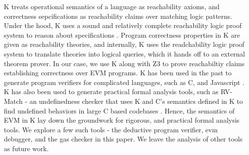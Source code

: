K treats operational semantics of a language as reachability axioms, and correctness sepcifications as reachability claims over matching logic patterns. Under the hood, K uses a sound and relatively complete reachability logic proof system to reason about specifications \cite{stefanescu-park-yuwen-li-rosu-2016-oopsla} \cite{stefanescu-ciobaca-mereuta-moore-serbanuta-rosu-2014-rta}. Program correctness properties in K are given as reachability theories, and internally, K uses the readchability logic proof system to translate theories into logical queries, which it hands off to an external theorem prover. In our case, we use K along with Z3 \cite{de2008z3} to prove reachabiltiy claims establishing correctness over EVM programs. K has been used in the past to generate program verifiers for complicated languages, such as C, and Javascript \cite{stefanescu-park-yuwen-li-rosu-2016-oopsla}. K has also been used to generate practical formal analysis tools, such as RV-Match - an undefinedness checker that uses K and C's semantics defined in K to find undefined behaviors in large C based codebases \cite{guth-hathhorn-saxena-rosu-2016-cav}. Hence, the semantics of EVM in K lay down the groundwork for rigorous, and practical formal analysis tools. We explore a few such tools - the deductive program verifier, evm debugger, and the gas checker in this paper. We leave the analysis of other tools as future work.

